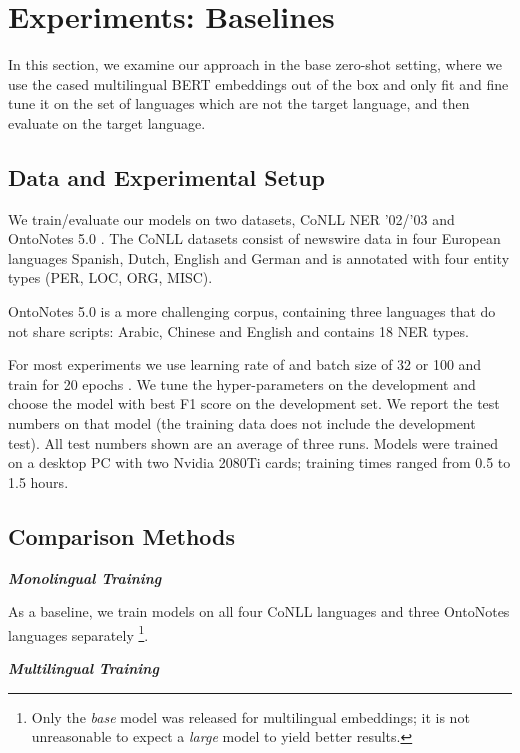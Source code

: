 \documentclass[letterpaper]{article} \usepackage{aaai20}  \usepackage{times}  \usepackage{helvet} \usepackage{courier}  \usepackage[hyphens]{url}  \usepackage{graphicx} \urlstyle{rm} \def\UrlFont{\rm}  \usepackage{graphicx}  \frenchspacing  \setlength{\pdfpagewidth}{8.5in}  \setlength{\pdfpageheight}{11in}  \usepackage{amsmath}
\begin{document}
 \section{Experiments: Baselines} \label{sec:exp:zero-shot}

In this section, we examine our approach in the base zero-shot setting, where we use the cased multilingual BERT embeddings out of the box and only fit and fine tune it on the set of languages which are not the target language, and then evaluate on the target language.

\subsection{Data and Experimental Setup}

We train/evaluate our models on two datasets, CoNLL NER '02/'03 \cite{TjongKimSang:2002:ICS:1118853.1118877} and
OntoNotes 5.0 \cite{ontonotes5}.  The CoNLL datasets consist of
newswire data in four European languages Spanish, Dutch, English and
German
and is annotated with four entity types (PER, LOC, ORG, MISC).

OntoNotes 5.0 is a more challenging corpus, containing three languages
that do not share scripts: Arabic, Chinese and English and contains 18
NER types.


For most experiments we use learning rate of  and batch size of
32 or 100 and train for 20 epochs
. We tune the hyper-parameters on the development and choose the model
with best F1 score on the development set. We report the test numbers
on that model (the training data does not include the development
test). All test numbers shown are an average of three runs. Models
were trained on a desktop PC with two Nvidia 2080Ti cards; training
times ranged from 0.5 to 1.5 hours.

\subsection{Comparison Methods}

\textbf{\textit{Monolingual Training}}

As a baseline, we train models
on all four CoNLL languages and three OntoNotes languages separately
\footnote{Only the \textit{base} model was released for multilingual
  embeddings; it is not unreasonable to expect a \textit{large} model
  to yield better results.}.


\vspace*{1mm}\noindent \textbf{\textit{Multilingual Training}}
\end{document}
